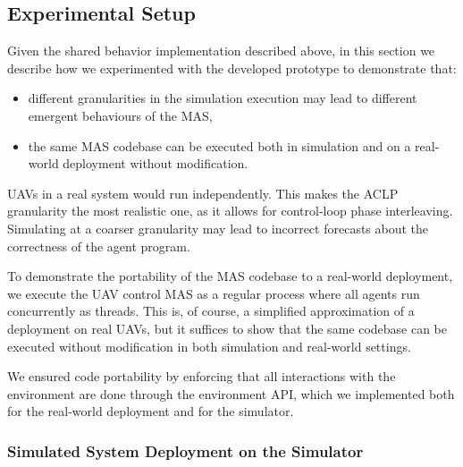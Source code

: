 \subsection{Experimental Setup}
\label{ssec:experimental-setup}
Given the shared behavior implementation described above,
in this section we describe how we experimented with the developed prototype
to demonstrate that:
\begin{itemize}
    \item different granularities in the simulation execution may lead to different emergent behaviours of the \ac{MAS},
    \item the same \ac{MAS} codebase can be executed both in simulation and on a real-world deployment without modification.
\end{itemize}

\acp{UAV} in a real system would run independently.
This makes the \ac{ACLP} granularity the most realistic one,
as it allows for control-loop phase interleaving.
%
Simulating at a coarser granularity
may lead to incorrect forecasts about the correctness of the agent program.

To demonstrate the portability of the \ac{MAS} codebase to a real-world deployment,
we execute the \ac{UAV} control \ac{MAS} as a regular process
where all agents run concurrently as threads.
%
This is, of course,
a simplified approximation of a deployment on real \acp{UAV},
but it suffices to show that the same codebase can be executed
without modification in both simulation and real-world settings.

We ensured code portability
by enforcing that all interactions with the environment are done through the \jakta{} environment \ac{API},
which we implemented both for the real-world deployment and for the \alchemist{} simulator.

\subsubsection{Simulated System Deployment on the \alchemist{} Simulator}
\label{ssec:simulator-execution}


